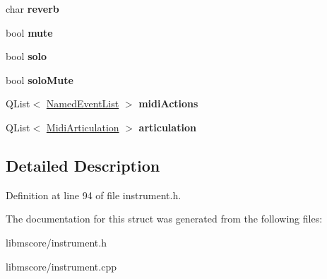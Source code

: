 \begin{DoxyCompactItemize}
char {\bfseries reverb}
\item 
\mbox{\label{struct_ms_1_1_channel_a4b6075a08fe5d5722c56481cb60136f7}} 
bool {\bfseries mute}
\item 
\mbox{\label{struct_ms_1_1_channel_a1c8105cbc32886f8723e69c6e02a96a3}} 
bool {\bfseries solo}
\item 
\mbox{\label{struct_ms_1_1_channel_a28979ea560572de36c30c1594afd6875}} 
bool {\bfseries solo\+Mute}
\item 
\mbox{\label{struct_ms_1_1_channel_ac78fca4538426c273532e017227a7acc}} 
Q\+List$<$ \hyperlink{struct_ms_1_1_named_event_list}{Named\+Event\+List} $>$ {\bfseries midi\+Actions}
\item 
\mbox{\label{struct_ms_1_1_channel_a8bff2cfb48398e1998068714c3084292}} 
Q\+List$<$ \hyperlink{struct_ms_1_1_midi_articulation}{Midi\+Articulation} $>$ {\bfseries articulation}
\end{DoxyCompactItemize}


\subsection{Detailed Description}


Definition at line 94 of file instrument.\+h.



The documentation for this struct was generated from the following files\+:\begin{DoxyCompactItemize}
\item 
libmscore/instrument.\+h\item 
libmscore/instrument.\+cpp\end{DoxyCompactItemize}

